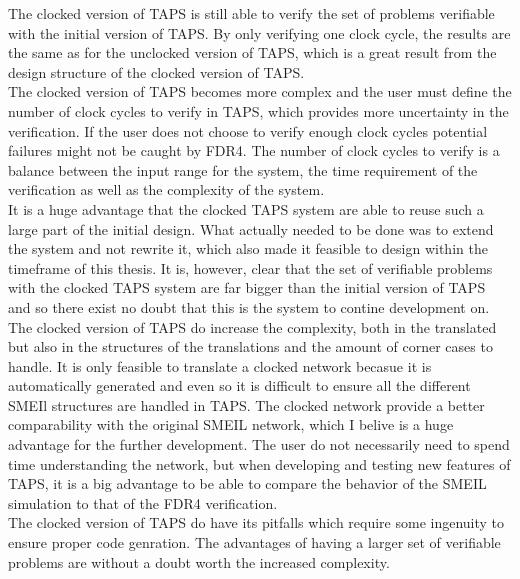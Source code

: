 The clocked version of TAPS is still able to verify the set of problems verifiable with the initial version of TAPS. By only verifying one clock cycle, the results are the same as for the unclocked version of TAPS, which is a great result from the design structure of the clocked version of TAPS. \\

The clocked version of TAPS becomes more complex and the user must define the number of clock cycles to verify in TAPS, which provides more uncertainty in the verification. If the user does not choose to verify enough clock cycles potential failures might not be caught by FDR4. The number of clock cycles to verify is a balance between the input range for the system, the time requirement of the verification as well as the complexity of the system. \\

It is a huge advantage that the clocked TAPS system are able to reuse such a large part of the initial design. What actually needed to be done was to extend the system and not rewrite it, which also made it feasible to design within the timeframe of this thesis. It is, however, clear that the set of verifiable problems with the clocked TAPS system are far bigger than the initial version of TAPS and so there exist no doubt that this is the system to contine development on. The clocked version of TAPS do increase the complexity, both in the translated \cspm{} but also in the structures of the translations and the amount of corner cases to handle. It is only feasible to translate a clocked network becasue it is automatically generated and even so it is difficult to ensure all the different SMEIl structures are handled in TAPS.
The clocked \cspm{} network provide a better comparability with the original SMEIL network, which I belive is a huge advantage for the further development. The user do not necessarily need to spend time understanding the \cspm{} network, but when developing and testing new features of TAPS, it is a big advantage to be able to compare the behavior of the SMEIL simulation to that of the FDR4 verification. \\


The clocked version of TAPS do have its pitfalls which require some ingenuity to ensure proper code genration. The advantages of having a larger set of verifiable problems are without a doubt worth the increased complexity.
